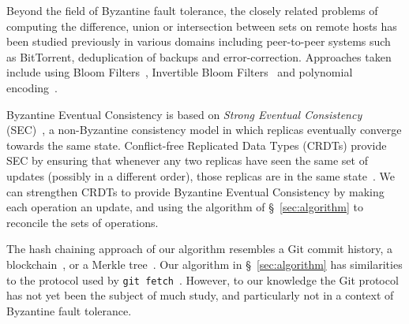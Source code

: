 \documentclass[a4paper,anonymous,USenglish]{lipics-v2019}
\begin{document}
Beyond the field of Byzantine fault tolerance, the closely related problems of computing the difference, union or intersection between sets on remote hosts has been studied previously in various domains including peer-to-peer systems such as BitTorrent, deduplication of backups and error-correction.
Approaches taken include using Bloom Filters~\cite{Skjegstad:2011}, Invertible Bloom Filters~\cite{Goodrich:2011,Eppstein:2011} and polynomial encoding~\cite{Minsky:2006}.

Byzantine Eventual Consistency is based on \emph{Strong Eventual Consistency} (SEC)~\cite{Shapiro:2011}, a non-Byzantine consistency model in which replicas eventually converge towards the same state.
Conflict-free Replicated Data Types (CRDTs) provide SEC by ensuring that whenever any two replicas have seen the same set of updates (possibly in a different order), those replicas are in the same state~\cite{Shapiro:2011}.
We can strengthen CRDTs to provide Byzantine Eventual Consistency by making each operation an update, and using the algorithm of \S~\ref{sec:algorithm} to reconcile the sets of operations.

The hash chaining approach of our algorithm resembles a Git commit history, a blockchain~\cite{Bano:2019}, or a Merkle tree~\cite{Merkle:1987}.
Our algorithm in \S~\ref{sec:algorithm} has similarities to the protocol used by \texttt{git fetch}~\cite{GitHTTP}.
However, to our knowledge the Git protocol has not yet been the subject of much study, and particularly not in a context of Byzantine fault tolerance.







\end{document}
